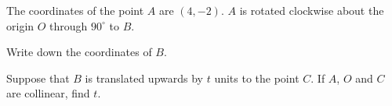 
The coordinates of the point $A$ are $(4,-2)$. $A$ is rotated clockwise about the origin $O$ through $90^{\circ}$ to $B$.

\begin{enumx}[label=(\alph*)]
\item Write down the coordinates of $B$.
\item Suppose that $B$ is translated upwards by $t$ units to the point $C$. If $A$, $O$ and $C$ are collinear, find $t$.

\end{enumx}



